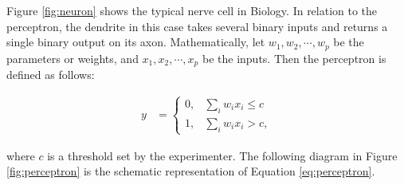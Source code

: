 Figure \ref{fig:neuron} shows the typical nerve cell in Biology. In relation to the perceptron, the dendrite in this case takes several binary inputs and returns a single binary output on its axon. Mathematically, let $w_1,w_2,\cdots,w_p$ be the parameters or weights, and $x_1,x_2,\cdots, x_p$ be the inputs. Then the perceptron is defined as follows:

\begin{equation}
\label{eq:perceptron}
\begin{aligned}
y&=
\begin{cases}
0,& \sum_{i}w_i x_i\leq c\\
1,& \sum_{i}w_i x_i> c,
\end{cases}
\end{aligned}
\end{equation}

where $c$ is a threshold set by the experimenter. The following diagram in Figure \ref{fig:perceptron} is the schematic representation of Equation \ref{eq:perceptron}.

